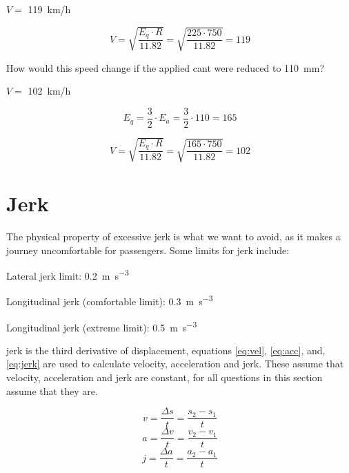 \documentclass{bcrre_exam}
\begin{document}
\begin{questions}
\begin{solution}
    $V=$ \qty{119}{km/h}
    
    \begin{equation}
        V=\sqrt{\frac{E_q \cdot R}{11.82}}=\sqrt{\frac{225 \cdot 750}{11.82}}=119
    \end{equation}
\end{solution}

\question
How would this speed change if the applied cant were reduced to \qty{110}{mm}?

\begin{solution}
    $V=$ \qty{102}{km/h}

    \begin{equation}
        E_q = \frac{3}{2} \cdot E_a = \frac{3}{2} \cdot 110 = 165
    \end{equation}
    
    \begin{equation}
        V=\sqrt{\frac{E_q \cdot R}{11.82}}=\sqrt{\frac{165 \cdot 750}{11.82}}=102
    \end{equation}
\end{solution}

\end{questions}

\newpage
\section{Jerk} 

The physical property of excessive jerk is what we want to avoid, as it makes a journey uncomfortable for passengers. Some limits for jerk include:

Lateral jerk limit: \qty{0.2}{\meter \per \second \cubed}

Longitudinal jerk (comfortable limit): \qty{0.3}{\meter \per \second \cubed}

Longitudinal jerk (extreme limit): \qty{0.5}{\meter \per \second \cubed}

jerk is the third derivative of displacement, equations \ref{eq:vel}, \ref{eq:acc}, and, \ref{eq:jerk} are used to calculate velocity, acceleration and jerk. These assume that velocity, acceleration and jerk are constant, for all questions in this section assume that they are.

\begin{equation}
    \label{eq:vel}
    v=\frac{\Delta s}{t} = \frac{s_2 - s_1}{t}
\end{equation}
\begin{equation}
\label{eq:acc}
    a=\frac{\Delta v}{t} = \frac{v_2 - v_1}{t}
\end{equation}
\begin{equation}
\label{eq:jerk}
    j=\frac{\Delta a}{t} = \frac{a_2 - a_1}{t}
\end{equation}
\end{document}
